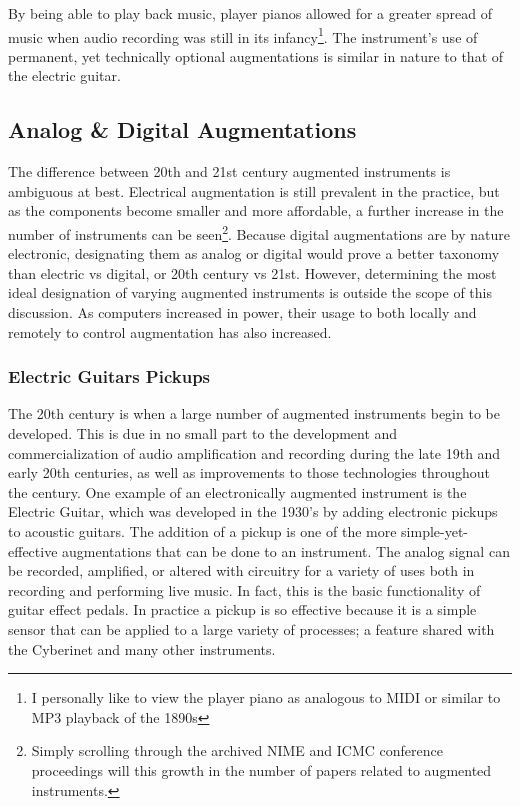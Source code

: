 By being able to play back music, player pianos allowed for a greater spread of music\cite{ppcomod} when audio recording was still in its infancy\footnote{I personally like to view the player piano as analogous to MIDI or similar to MP3 playback of the 1890s}. The instrument's use of permanent, yet technically optional augmentations is similar in nature to that of the electric guitar.

\subsection{ Analog \& Digital Augmentations}
The difference between 20th and 21st century augmented instruments is ambiguous at best. Electrical augmentation is still prevalent in the practice, but as the components become smaller and more affordable, a further increase in the number of instruments can be seen\footnote{Simply scrolling through the archived NIME and ICMC conference proceedings will this growth in the number of papers related to augmented instruments.}. Because digital augmentations are by nature electronic, designating them as analog or digital would prove a better taxonomy than electric vs digital, or 20th century vs 21st. However, determining the most ideal designation of varying augmented instruments is outside the scope of this discussion. As computers increased in power, their usage to both locally and remotely to control augmentation has also increased.

\subsubsection{Electric Guitars Pickups}

The 20th century is when a large number of augmented instruments begin to be developed. This is due in no small part to the development and commercialization of audio amplification and recording during the late 19th and early 20th centuries\cite{recHist}, as well as improvements to those technologies throughout the century. One example of an electronically augmented instrument is the Electric Guitar, which was developed in the 1930's by adding electronic pickups to acoustic guitars\cite{electric_guit_history}. The addition of a pickup is one of the more simple-yet-effective augmentations that can be done to an instrument. The analog signal can be recorded, amplified, or altered with circuitry for a variety of uses both in recording and performing live music. In fact, this is the basic functionality of guitar effect pedals. In practice a pickup is so effective because it is a simple sensor that can be applied to a large variety of processes; a feature shared with the Cyberinet and many other instruments.

